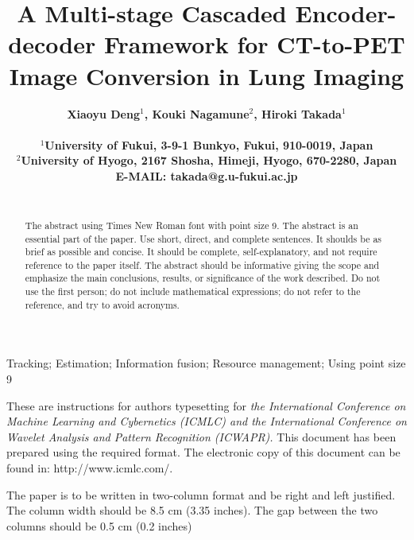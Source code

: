 \documentclass[a4paper, times, 10pt,twocolumn]{article}
\begin{document}
\title{A Multi-stage Cascaded Encoder-decoder Framework for CT-to-PET Image Conversion in Lung Imaging}  %

\author{\bf{\normalsize{Xiaoyu Deng${^1}$, Kouki Nagamune${^2}$, Hiroki Takada${^1}$}}\\ %
\\
\normalsize{$^1$University of Fukui, 3-9-1 Bunkyo, Fukui, 910-0019, Japan}\\
\normalsize{$^2$University of Hyogo, 2167 Shosha, Himeji, Hyogo, 670-2280, Japan} \\
\normalsize{E-MAIL: takada@g.u-fukui.ac.jp}\\
\\}


\maketitle \thispagestyle{empty}

\begin{abstract}
   {The abstract using Times New Roman font with point size 9. The abstract is an essential part of the paper. Use short, direct, and complete sentences. It shoulds be as brief as possible and concise. It should be complete, self-explanatory, and not require reference to the paper itself. The abstract should be informative giving the scope and emphasize the main conclusions, results, or significance of the work described. Do not use the first person; do not include mathematical expressions; do not refer to the reference, and try to avoid acronyms.}
\end{abstract}
\begin{keywords}
   {Tracking; Estimation; Information fusion; Resource
    management; Using point size 9}
\end{keywords}


These are instructions for authors typesetting for {\it the International Conference on Machine Learning and Cybernetics (ICMLC) and the International Conference on Wavelet Analysis and Pattern Recognition (ICWAPR).} This document has been prepared using the required format. The electronic copy of this document can be found in: http://www.icmlc.com/.

The paper is to be written in two-column format and be right and left justified. The column width should be 8.5 cm (3.35 inches). The gap between the two columns should be 0.5 cm (0.2 inches)
\end{document}
